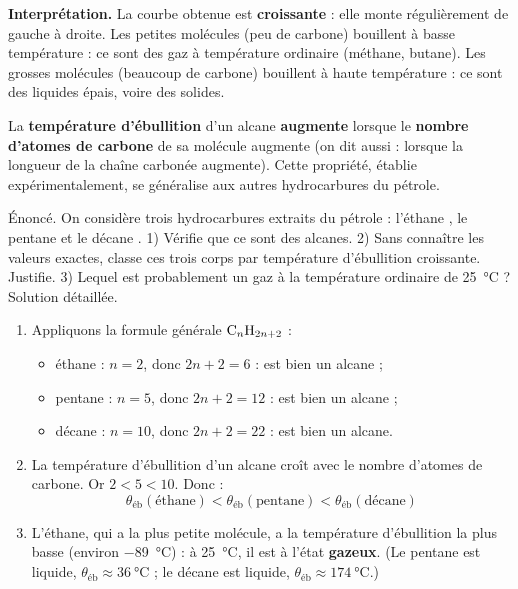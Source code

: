 \documentclass[11pt]{article}
\begin{document}
\textbf{Interprétation.} La courbe obtenue est \textbf{croissante} : elle monte régulièrement de gauche à droite. Les petites molécules (peu de carbone) bouillent à basse température : ce sont des gaz à température ordinaire (méthane, butane). Les grosses molécules (beaucoup de carbone) bouillent à haute température : ce sont des liquides épais, voire des solides.

\begin{propriete}
La \textbf{température d'ébullition} d'un alcane \textbf{augmente} lorsque le \textbf{nombre d'atomes de carbone} de sa molécule augmente (on dit aussi : lorsque la longueur de la chaîne carbonée augmente). Cette propriété, établie expérimentalement, se généralise aux autres hydrocarbures du pétrole.
\end{propriete}

\begin{exoresolu}
Énoncé. On considère trois hydrocarbures extraits du pétrole : l'éthane , le pentane  et le décane . 1) Vérifie que ce sont des alcanes. 2) Sans connaître les valeurs exactes, classe ces trois corps par température d'ébullition croissante. Justifie. 3) Lequel est probablement un gaz à la température ordinaire de \SI{25}{\celsius} ?
\tcblower
Solution détaillée.
\begin{enumerate}
\item Appliquons la formule générale $\ce{C_nH_{2n+2}}$ :
\begin{itemize}
\item éthane : $n = 2$, donc $2n + 2 = 6$ :  est bien un alcane ;
\item pentane : $n = 5$, donc $2n + 2 = 12$ :  est bien un alcane ;
\item décane : $n = 10$, donc $2n + 2 = 22$ :  est bien un alcane.
\end{itemize}
\item La température d'ébullition d'un alcane croît avec le nombre d'atomes de carbone. Or $2 < 5 < 10$. Donc :
\[ \theta_{\text{éb}}(\text{éthane}) < \theta_{\text{éb}}(\text{pentane}) < \theta_{\text{éb}}(\text{décane}) \]
\item L'éthane, qui a la plus petite molécule, a la température d'ébullition la plus basse (environ \SI{-89}{\celsius}) : à \SI{25}{\celsius}, il est à l'état \textbf{gazeux}. (Le pentane est liquide, $\theta_{\text{éb}} \approx \SI{36}{\celsius}$ ; le décane est liquide, $\theta_{\text{éb}} \approx \SI{174}{\celsius}$.)
\end{enumerate}
\end{exoresolu}
\end{document}
